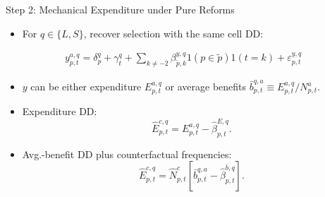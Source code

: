\begin{frame}{Step 2: Mechanical Expenditure under Pure Reforms}
\begin{itemize}
    \item For $q\in\{L,S\}$, recover selection with the same cell DD:
\end{itemize}
\vspace{-0.7em}
{\small
\begin{align*}
    y^{a,q}_{p,t}
    =
    \delta_{p}^{q}
    +
    \gamma_t^{q}
    +
    \sum_{k\neq -2}\beta_{\tilde p,k}^{y,q}
    1(p\in \tilde p)1(t=k)
    +
    \varepsilon_{p,t}^{y,q}
\end{align*}}
\vspace{-1.0em}
\begin{itemize}
    \item $y$ can be either expenditure $E^{a,q}_{p,t}$ or average benefits $\bar b^{q,a}_{p,t}\equiv E^{a,q}_{p,t}/N^a_{p,t}$.
    \item Expenditure DD:
    \[
        \widehat E^{c,q}_{p,t}
        =
        E^{a,q}_{p,t}
        -
        \widehat\beta^{E,q}_{p,t}.
    \]
    \item Avg.-benefit DD plus counterfactual frequencies:
    \[
        \widehat E^{c,q}_{p,t}
        =
        \widehat N^{c}_{p,t}
        \left[
        \bar b^{q,a}_{p,t}
        -
        \widehat\beta^{\bar b,q}_{p,t}
        \right].
    \]
\end{itemize}
\end{frame}

